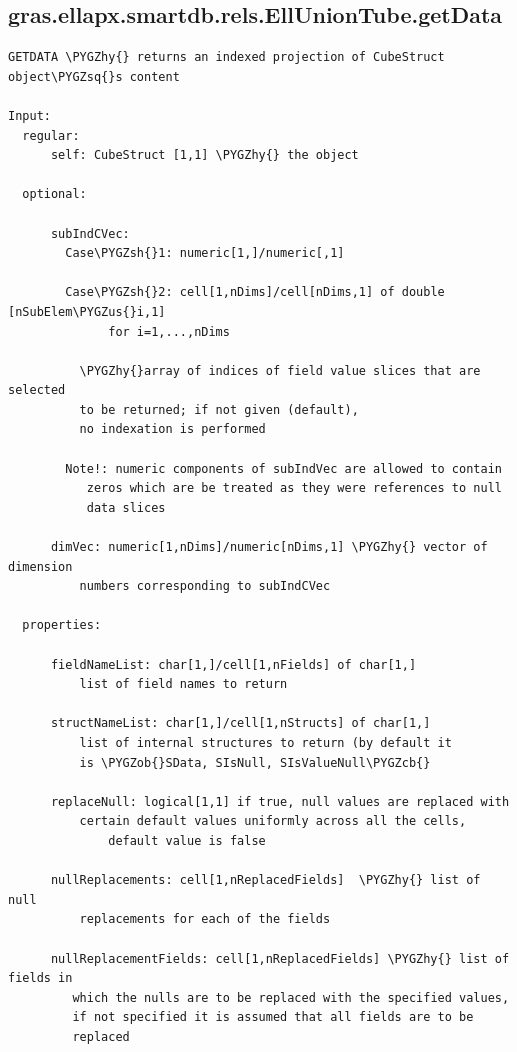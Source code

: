 \documentclass[letterpaper,10pt,english]{sphinxmanual}
\def\PYGZus{\char`\_}
\def\PYGZob{\char`\{}
\def\PYGZcb{\char`\}}
\def\PYGZsh{\char`\#}
\def\PYGZhy{\char`\-}
\def\PYGZsq{\char`\'}
\begin{document}
\subsection{gras.ellapx.smartdb.rels.EllUnionTube.getData}
\label{chap_functions:gras-ellapx-smartdb-rels-elluniontube-getdata}
\begin{Verbatim}[commandchars=\\\{\}]
GETDATA \PYGZhy{} returns an indexed projection of CubeStruct object\PYGZsq{}s content

Input:
  regular:
      self: CubeStruct [1,1] \PYGZhy{} the object

  optional:

      subIndCVec:
        Case\PYGZsh{}1: numeric[1,]/numeric[,1]

        Case\PYGZsh{}2: cell[1,nDims]/cell[nDims,1] of double [nSubElem\PYGZus{}i,1]
              for i=1,...,nDims

          \PYGZhy{}array of indices of field value slices that are selected
          to be returned; if not given (default),
          no indexation is performed

        Note!: numeric components of subIndVec are allowed to contain
           zeros which are be treated as they were references to null
           data slices

      dimVec: numeric[1,nDims]/numeric[nDims,1] \PYGZhy{} vector of dimension
          numbers corresponding to subIndCVec

  properties:

      fieldNameList: char[1,]/cell[1,nFields] of char[1,]
          list of field names to return

      structNameList: char[1,]/cell[1,nStructs] of char[1,]
          list of internal structures to return (by default it
          is \PYGZob{}SData, SIsNull, SIsValueNull\PYGZcb{}

      replaceNull: logical[1,1] if true, null values are replaced with
          certain default values uniformly across all the cells,
              default value is false

      nullReplacements: cell[1,nReplacedFields]  \PYGZhy{} list of null
          replacements for each of the fields

      nullReplacementFields: cell[1,nReplacedFields] \PYGZhy{} list of fields in
         which the nulls are to be replaced with the specified values,
         if not specified it is assumed that all fields are to be
         replaced


\end{Verbatim}
\end{document}
